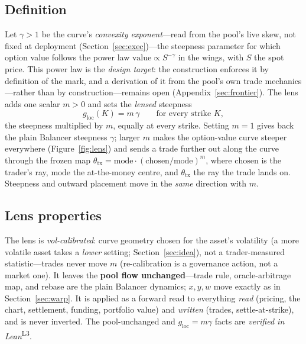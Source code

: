 \documentclass[runningheads]{llncs}
\newcommand{\tfp}{\emph{verified in Lean}}
\begin{document}
\subsection{Definition}
Let $\gamma>1$ be the curve's \emph{convexity exponent}---read from the pool's
live skew, not fixed at deployment (Section~\ref{sec:exec})---the steepness
parameter for which option value follows the power law
$\mathrm{value}\propto S^{-\gamma}$ in the wings, with $S$ the spot price. This
power law is the \emph{design target}: the construction enforces it by definition
of the mark, and a derivation of it from the pool's own trade
mechanics---rather than by construction---remains open (Appendix~\ref{sec:frontier}).
The lens adds one scalar $m>0$ and sets the \emph{lensed} steepness
\begin{equation}
  g_{\mathrm{loc}}(K)=m\,\gamma\qquad\text{for every strike }K,
  \label{eq:lens}
\end{equation}
the steepness multiplied by $m$, equally at every strike. Setting $m=1$ gives back
the plain Balancer steepness $\gamma$; larger $m$ makes the option-value curve
steeper everywhere (Figure~\ref{fig:lens}) and sends a trade further out along the
curve through the frozen map
$\theta_{\mathrm{tx}}=\mathrm{mode}\cdot(\mathrm{chosen}/\mathrm{mode})^{m}$,
where $\mathrm{chosen}$ is the trader's ray, $\mathrm{mode}$ the at-the-money
centre, and $\theta_{\mathrm{tx}}$ the ray the trade lands on. Steepness and
outward placement move in the \emph{same} direction with $m$.

\subsection{Lens properties}
The lens is \emph{vol-calibrated}: curve geometry chosen for the asset's
volatility (a more volatile asset takes a \emph{lower} setting;
Section~\ref{sec:idea}), not a trader-measured statistic---trades never move
$m$ (re-calibration is a governance action, not a market one).
It leaves the \textbf{pool flow unchanged}---trade rule, oracle-arbitrage map, and
rebase are the plain Balancer dynamics; $x,y,w$ move exactly as in
Section~\ref{sec:warp}. It is applied as a forward read to everything \emph{read}
(pricing, the chart, settlement, funding, portfolio value) and \emph{written}
(trades, settle-at-strike), and is never inverted. The pool-unchanged and
$g_{\mathrm{loc}}=m\gamma$ facts are \tfp{}\textsuperscript{L3}.
\end{document}
